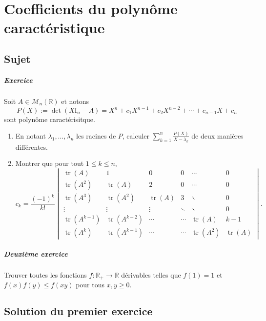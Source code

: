 \chapter{Coefficients du polynôme caractéristique}

\section{Sujet}

\paragraph{Exercice}

Soit $A \in \mathscr M_n(\mathbb R)$ et notons
\[
P(X) := \det(X\mathrm I_n - A) = X^n + c_1 X^{n-1} + c_2 X^{n-2} + \cdots + c_{n-1} X + c_n
\]
sont polynôme caractérisitque.
\begin{enumerate}[label = \arabic*)]
    \item En notant $\lambda_1,\dots,\lambda_n$ les racines de $P$, calculer $\sum_{k=1}^n \frac{P(X)}{X-\lambda_k}$ de deux manières différentes.
    \item Montrer que pour tout $1 \leqslant k \leqslant n$,
    \newcommand{\tr}[1]{\operatorname{tr}(#1)}
    \[
    c_k = \frac{(-1)^k}{k!}\begin{vmatrix}
         \tr{A} & 1 & 0 & 0 & \cdots & 0  \\
         \tr{A^2} & \tr{A} & 2 & 0 & \cdots & 0\\ 
         \tr{A^3} & \tr{A^2} & \tr{A} & 3 & \ddots & 0\\
         \vdots & \vdots & \vdots & \ddots & \ddots & 0\\
         \tr{A^{k-1}} & \tr{A^{k-2}} & \cdots & \cdots & \tr{A} & k-1\\
         \tr{A^k} & \tr{A^{k-1}} & \cdots & \cdots & \tr{A^2} & \tr{A}
    \end{vmatrix}.
    \]
\end{enumerate}

\paragraph{Deuxième exercice}

Trouver toutes les fonctions $f : \mathbb R_+ \to \mathbb R$ dérivables telles que $f(1)=1$ et $f(x)f(y) \leq f(xy)$ pour tous $x,y \geqslant 0$.

\section{Solution du premier exercice} %

